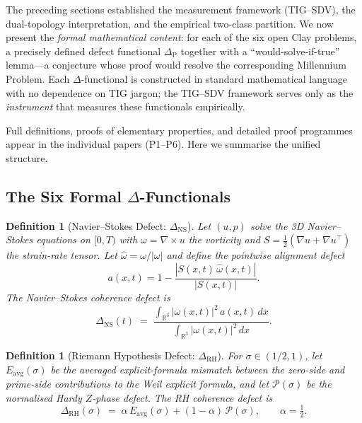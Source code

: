\documentclass[11pt]{article}
\newtheorem{definition}[theorem]{Definition}
\begin{document}
The preceding sections established the measurement framework (TIG--SDV),
the dual-topology interpretation, and the empirical two-class partition.
We now present the \emph{formal mathematical content}: for each of the
six open Clay problems, a precisely defined defect functional
$\Delta_{\mathrm{P}}$ together with a ``would-solve-if-true'' lemma---a
conjecture whose proof would resolve the corresponding Millennium Problem.
Each $\Delta$-functional is constructed in standard mathematical language
with no dependence on TIG jargon; the TIG--SDV framework serves only as
the \emph{instrument} that measures these functionals empirically.

Full definitions, proofs of elementary properties, and detailed proof
programmes appear in the individual papers (P1--P6).  Here we summarise
the unified structure.

\subsection{The Six Formal $\Delta$-Functionals}
\label{subsec:six-deltas}

\begin{definition}[Navier--Stokes Defect: $\Delta_{\mathrm{NS}}$]
\label{def:delta-ns}
Let $(u, p)$ solve the 3D Navier--Stokes equations on $[0,T)$
with $\omega = \nabla \times u$ the vorticity and
$S = \frac{1}{2}(\nabla u + \nabla u^{\top})$ the strain-rate tensor.
Let $\hat{\omega} = \omega / |\omega|$ and define the pointwise
alignment defect
\[
  a(x,t) = 1 - \frac{|S(x,t)\,\hat{\omega}(x,t)|}{|S(x,t)|}.
\]
The \emph{Navier--Stokes coherence defect} is
\[
  \boxed{\Delta_{\mathrm{NS}}(t) \;=\;
  \frac{\displaystyle\int_{\mathbb{R}^3} |\omega(x,t)|^2\, a(x,t)\, dx}
       {\displaystyle\int_{\mathbb{R}^3} |\omega(x,t)|^2\, dx}.}
\]
\end{definition}

\begin{definition}[Riemann Hypothesis Defect: $\Delta_{\mathrm{RH}}$]
\label{def:delta-rh}
For $\sigma \in (1/2, 1)$, let $E_{\mathrm{avg}}(\sigma)$ be the
averaged explicit-formula mismatch between the zero-side and prime-side
contributions to the Weil explicit formula, and let
$\mathcal{P}(\sigma)$ be the normalised Hardy $Z$-phase defect.
The \emph{RH coherence defect} is
\[
  \boxed{\Delta_{\mathrm{RH}}(\sigma) \;=\;
  \alpha\, E_{\mathrm{avg}}(\sigma)
  + (1 - \alpha)\, \mathcal{P}(\sigma),
  \qquad \alpha = \tfrac{1}{2}.}
\]
\end{definition}
\end{document}
